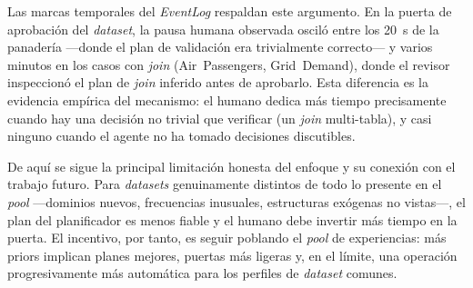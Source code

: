 Las marcas temporales del \textit{EventLog} respaldan este argumento. En la puerta de
aprobación del \textit{dataset}, la pausa humana observada osciló entre los 20~s de la
panadería —donde el plan de validación era trivialmente correcto— y varios minutos en
los casos con \textit{join} (Air~Passengers, Grid~Demand), donde el revisor inspeccionó
el plan de \textit{join} inferido antes de aprobarlo. Esta diferencia es la evidencia
empírica del mecanismo: el humano dedica más tiempo precisamente cuando hay una decisión
no trivial que verificar (un \textit{join} multi-tabla), y casi ninguno cuando el agente
no ha tomado decisiones discutibles.

De aquí se sigue la principal limitación honesta del enfoque y su conexión con el
trabajo futuro. Para \textit{datasets} genuinamente distintos de todo lo presente en el
\textit{pool} —dominios nuevos, frecuencias inusuales, estructuras exógenas no vistas—,
el plan del planificador es menos fiable y el humano debe invertir más tiempo en la
puerta. El incentivo, por tanto, es seguir poblando el \textit{pool} de experiencias:
más priors implican planes mejores, puertas más ligeras y, en el límite, una operación
progresivamente más automática para los perfiles de \textit{dataset} comunes.

